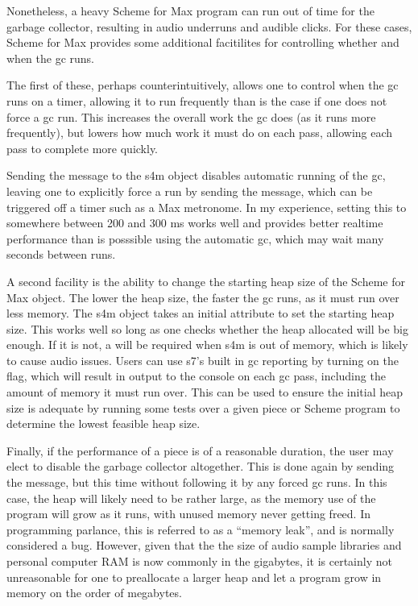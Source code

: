 \documentclass[letterpaper,10pt,english]{sphinxmanual}
\begin{document}
\sphinxAtStartPar
Nonetheless, a heavy Scheme for Max program can run out of time for
the garbage collector, resulting in audio underruns and audible clicks.
For these cases, Scheme for Max provides some additional facitilites
for controlling whether and when the gc runs.

\sphinxAtStartPar
The first of these, perhaps counterintuitively, allows one to control
when the gc runs on a timer, allowing it to run  frequently
than is the case if one does not force a gc run. This increases
the overall work the gc does (as it runs more frequently), but lowers
how much work it must do on each pass, allowing each pass to complete more quickly.

\sphinxAtStartPar
Sending the  message to the s4m object disables automatic
running of the gc, leaving one to explicitly force a run by sending
the  message, which can be triggered off a timer such as a
Max metronome. In my experience, setting this to somewhere between
200 and 300 ms works well and provides better real\sphinxhyphen{}time performance
than is posssible using the automatic gc, which may wait many seconds between runs.

\sphinxAtStartPar
A second facility is the ability to change the starting heap size of the Scheme for Max object.
The lower the heap size, the faster the gc runs, as it must run over less
memory. The s4m object takes an initial
 attribute to set the starting heap size. This works well so
long as one checks whether the heap allocated will be big enough.
If it is not, a  will be required when s4m is out of memory,
which is likely to cause audio issues.
Users can use s7’s built in gc reporting by turning on the  flag,
which will result in output to the console on each gc pass, including the
amount of memory it must run over. This can be used to ensure the initial
heap size is adequate by running some tests over a given piece or Scheme program
to determine the lowest feasible heap size.

\sphinxAtStartPar
Finally, if the performance of a piece is of a reasonable duration, the
user may elect to disable the garbage collector altogether.
This is done again by sending the  message, but this time without
following it by any forced gc runs. In this case, the heap will likely
need to be rather large, as the memory use of the program will grow as it
runs, with unused memory never getting freed. In programming parlance,
this is referred to as a “memory leak”, and is normally considered
a bug. However, given that the the size of audio sample libraries and personal computer RAM
is now commonly in the gigabytes, it is certainly
not unreasonable for one to pre\sphinxhyphen{}allocate a larger heap and let a program grow
in memory on the order of megabytes.
\end{document}
